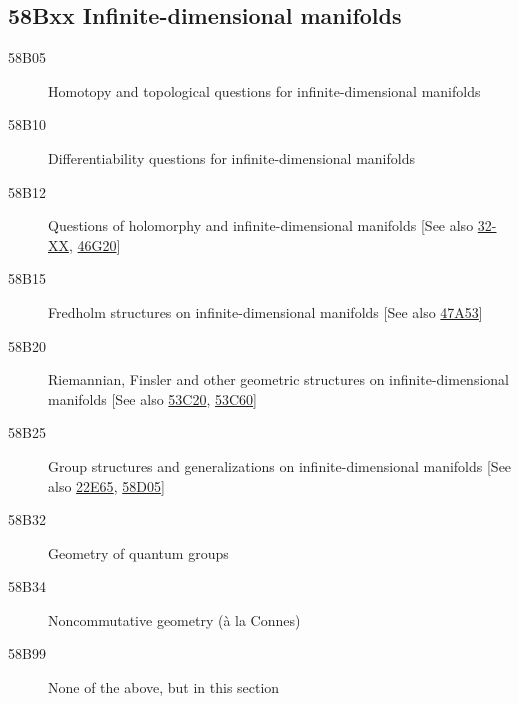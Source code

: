 \documentclass[letterpaper]{article}
\begin{document}
\subsection*{58Bxx  Infinite-dimensional manifolds }\label{58Bxx}
\begin{description}  
\item [58B05]\label{58B05} Homotopy and topological questions for infinite-dimensional manifolds
\item [58B10]\label{58B10} Differentiability questions for infinite-dimensional manifolds
\item [58B12]\label{58B12} Questions of holomorphy and infinite-dimensional manifolds [See also \hyperref[32-XX]{32-XX}, \hyperref[46G20]{46G20}]
\item [58B15]\label{58B15} Fredholm structures on infinite-dimensional manifolds [See also \hyperref[47A53]{47A53}]
\item [58B20]\label{58B20} Riemannian, Finsler and other geometric structures  on infinite-dimensional manifolds [See also \hyperref[53C20]{53C20}, \hyperref[53C60]{53C60}]
\item [58B25]\label{58B25} Group structures and generalizations on infinite-dimensional manifolds [See also \hyperref[22E65]{22E65}, \hyperref[58D05]{58D05}]
\item [58B32]\label{58B32} Geometry of quantum groups
\item [58B34]\label{58B34} Noncommutative geometry (\`{a} la Connes)
\item [58B99]\label{58B99} None of the above, but in this section
\end{description}
\end{document}
